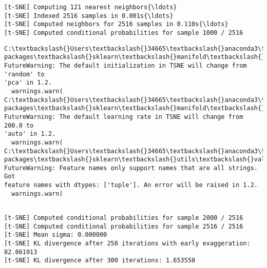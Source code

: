 \documentclass[11pt]{article}
\begin{document}
    \begin{Verbatim}[commandchars=\\\{\}]
[t-SNE] Computing 121 nearest neighbors{\ldots}
[t-SNE] Indexed 2516 samples in 0.001s{\ldots}
[t-SNE] Computed neighbors for 2516 samples in 0.110s{\ldots}
[t-SNE] Computed conditional probabilities for sample 1000 / 2516
    \end{Verbatim}

    \begin{Verbatim}[commandchars=\\\{\}]
C:\textbackslash{}Users\textbackslash{}34665\textbackslash{}anaconda3\textbackslash{}lib\textbackslash{}site-packages\textbackslash{}sklearn\textbackslash{}manifold\textbackslash{}\_t\_sne.py:780:
FutureWarning: The default initialization in TSNE will change from 'random' to
'pca' in 1.2.
  warnings.warn(
C:\textbackslash{}Users\textbackslash{}34665\textbackslash{}anaconda3\textbackslash{}lib\textbackslash{}site-packages\textbackslash{}sklearn\textbackslash{}manifold\textbackslash{}\_t\_sne.py:790:
FutureWarning: The default learning rate in TSNE will change from 200.0 to
'auto' in 1.2.
  warnings.warn(
C:\textbackslash{}Users\textbackslash{}34665\textbackslash{}anaconda3\textbackslash{}lib\textbackslash{}site-packages\textbackslash{}sklearn\textbackslash{}utils\textbackslash{}validation.py:1688:
FutureWarning: Feature names only support names that are all strings. Got
feature names with dtypes: ['tuple']. An error will be raised in 1.2.
  warnings.warn(
    \end{Verbatim}

    \begin{Verbatim}[commandchars=\\\{\}]

[t-SNE] Computed conditional probabilities for sample 2000 / 2516
[t-SNE] Computed conditional probabilities for sample 2516 / 2516
[t-SNE] Mean sigma: 0.000000
[t-SNE] KL divergence after 250 iterations with early exaggeration: 82.061913
[t-SNE] KL divergence after 300 iterations: 1.653558
    \end{Verbatim}

    \begin{center}
    \end{center}
    { \hspace*{\fill} \\}
    
\end{document}
